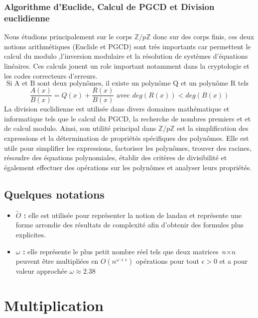 \documentclass[a4paper]{article}
\begin{document}
 \subsubsection{Algorithme d'Euclide, Calcul de PGCD et Division euclidienne}
 
Nous étudions principalement sur le corps ${\mathbb{Z}/p \mathbb{Z}}$ donc sur des corps finis, ces deux notions arithmétiques (Euclide et PGCD) sont très importants car permettent le calcul du modulo ,l'inversion modulaire et la résolution de systèmes d'équations linéaires. Ces calculs jouent un role important notamment dans la cryptologie et les codes correcteurs d'erreurs.
\[
\text{ Si A et B sont deux polynômes, il existe un polynôme Q et un polynôme R tels que }\] 
 \[ \dfrac{A(x)}{B(x)} = Q(x)+\dfrac{R(x)}{B(x)} \text{ avec } deg(R(x)) < deg(B(x))
\]
La division euclidienne est utilisée dans divers domaines mathématique et informatique tels que le calcul du PGCD, la recherche de nombres premiers et et de calcul modulo. Ainsi, son utilité principal dans ${\mathbb{Z}/p \mathbb{Z}}$ est la simplification des expressions et la détermination de propriétés spécifiques des polynômes. Elle est utile pour simplifier les expressions, factoriser les polynômes, trouver des racines, résoudre des équations polynomiales, établir des critères de divisibilité et également effectuer des opérations sur les polynômes et analyser leurs propriétés.

 \subsection{Quelques notations}
 \begin{itemize}
 \item \textbf{$\tilde{O}$ :} elle est utilisée pour représenter la notion de landau et représente une forme arrondie des résultats de complexité afin d'obtenir des formules plus explicites.
 \item \textbf{$\omega$ :} elle représente le plus petit nombre réel tels que deux matrices $\textit{n}\times\textit{n}$ peuvent être multipliées en $O(\textit{n}^{\omega+\epsilon})$ opérations pour tout $\epsilon>0$ et a pour valeur approchée $\omega\approx2.38$

 
 \end{itemize}


\section{Multiplication}
\end{document}
